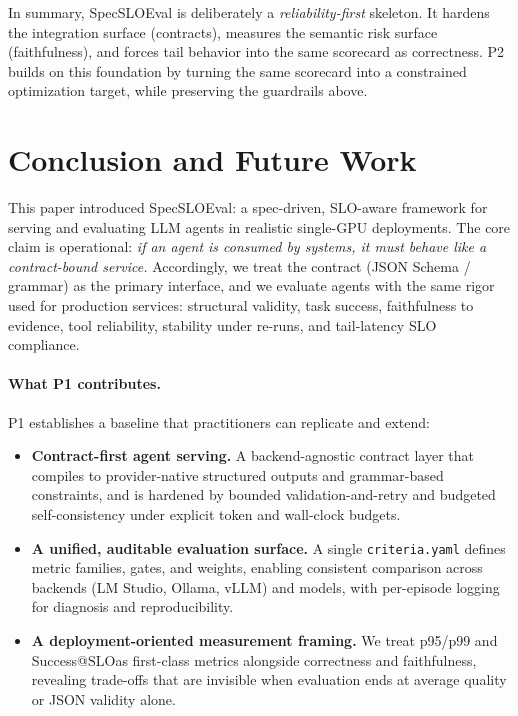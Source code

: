\documentclass[11pt]{article}
\newcommand{\slo}{\ensuremath{\mathrm{SLO}}}
\begin{document}
In summary, SpecSLOEval is deliberately a \emph{reliability-first} skeleton.
It hardens the integration surface (contracts), measures the semantic risk surface (faithfulness), and forces tail behavior into the same scorecard as correctness.
P2 builds on this foundation by turning the same scorecard into a constrained optimization target, while preserving the guardrails above.

\section{Conclusion and Future Work}
\label{sec:conclusion}

This paper introduced SpecSLOEval: a spec-driven, SLO-aware framework for serving and evaluating LLM agents in realistic single-GPU deployments.
The core claim is operational:
\emph{if an agent is consumed by systems, it must behave like a contract-bound service.}
Accordingly, we treat the contract (JSON Schema / grammar) as the primary interface, and we evaluate agents with the same rigor used for production services: structural validity, task success, faithfulness to evidence, tool reliability, stability under re-runs, and tail-latency SLO compliance.

\paragraph{What P1 contributes.}
P1 establishes a baseline that practitioners can replicate and extend:

\begin{itemize}[leftmargin=12pt]
    \item \textbf{Contract-first agent serving.}
    A backend-agnostic contract layer that compiles to provider-native structured outputs and grammar-based constraints, and is hardened by bounded validation-and-retry and budgeted self-consistency under explicit token and wall-clock budgets.

    \item \textbf{A unified, auditable evaluation surface.}
    A single \texttt{criteria.yaml} defines metric families, gates, and weights, enabling consistent comparison across backends (LM Studio, Ollama, vLLM) and models, with per-episode logging for diagnosis and reproducibility.

    \item \textbf{A deployment-oriented measurement framing.}
    We treat p95/p99 and Success@\slo as first-class metrics alongside correctness and faithfulness, revealing trade-offs that are invisible when evaluation ends at average quality or JSON validity alone.
\end{itemize}
\end{document}
